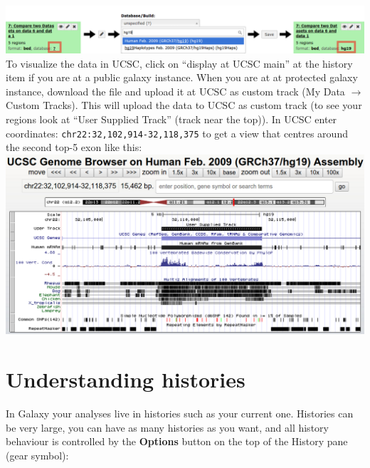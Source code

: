 \documentclass[11pt,a4paper]{article}
\begin{document}
\includegraphics[width=\textwidth]{figures/101_20}\\

To visualize the data in UCSC, click on ``display at UCSC main'' at the history item if you are at a public galaxy instance.
When you are at at protected galaxy instance, download the file and upload it at UCSC as custom track (My Data $\rightarrow$ Custom Tracks). This will upload the data to UCSC as custom track (to
see your regions look at ``User Supplied Track'' (track near the top)). In UCSC enter coordinates: \verb|chr22:32,102,914-32,118,375| to get a view that centres around the second top-5 exon like this:\\

\includegraphics[width=\textwidth]{figures/101_21}\\
\section{Understanding histories}
In Galaxy your analyses live in histories such as your current one. Histories can be very large, you can have as many histories as you want, and all history behaviour is controlled by the \textbf{Options} button on the top of the History pane (gear symbol):\\
\end{document}
